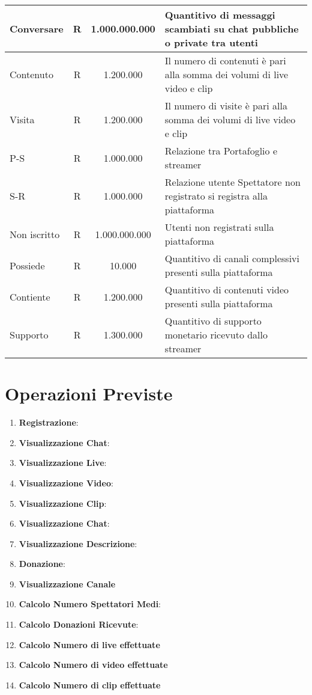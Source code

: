 \begin{longtable}{ |l|c|c|p{6.2cm}|}
  Conversare & R &1.000.000.000 & Quantitivo di messaggi scambiati su chat pubbliche o private tra utenti\\\hline
  Contenuto & R & 1.200.000 & Il numero di contenuti è pari alla somma dei volumi di live video e clip  \\\hline %
  Visita & R & 1.200.000& Il numero di visite è pari alla somma dei volumi di live video e clip \\\hline %
  P-S & R &1.000.000 & Relazione tra Portafoglio e streamer \\\hline 
  S-R & R & 1.000.000 & Relazione utente Spettatore non registrato si registra alla piattaforma\\\hline
  Non iscritto & R & 1.000.000.000 & Utenti non registrati sulla piattaforma\\\hline
  Possiede & R & 10.000 &Quantitivo di canali complessivi presenti sulla piattaforma \\\hline
  Contiente & R & 1.200.000&Quantitivo di contenuti video presenti sulla piattaforma \\\hline
  Supporto & R & 1.300.000 &Quantitivo di supporto monetario ricevuto dallo streamer \\\hline

\end{longtable}
\normalsize

\section{Operazioni Previste}
\begin{enumerate}
    \item \textbf{Registrazione}: 
    \item \textbf{Visualizzazione Chat}:
    \item \textbf{Visualizzazione Live}: 
    \item \textbf{Visualizzazione Video}:
    \item \textbf{Visualizzazione Clip}: 
    \item \textbf{Visualizzazione Chat}: 
    \item \textbf{Visualizzazione Descrizione}:
    \item \textbf{Donazione}:
    \item \textbf{Visualizzazione Canale}
    \item \textbf{Calcolo Numero Spettatori Medi}:
    \item \textbf{Calcolo Donazioni Ricevute}: 
    \item \textbf{Calcolo Numero di live effettuate} 
    \item \textbf{Calcolo Numero di video effettuate} 
    \item \textbf{Calcolo Numero di clip effettuate} 
\end{enumerate}
